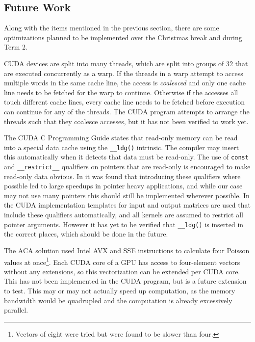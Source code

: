 \subsection{Future Work}
\label{sec:FutureOptimization}
Along with the items mentioned in the previous section, there are some optimizations planned to be implemented over the Christmas break and during Term 2.

CUDA devices are split into many threads, which are split into groups of 32 that are executed concurrently as a warp\cite{tool:CUDAProgrammingV1}.
If the threads in a warp attempt to access multiple words in the same cache line, the access is \textit{coalesced}\cite{NVIDIAHowBlog} and only one cache line needs to be fetched for the warp to continue.
Otherwise if the accesses all touch different cache lines, every cache line needs to be fetched before execution can continue for any of the threads.
The CUDA program attempts to arrange the threads such that they coalesce accesses, but it has not been verified to work yet.

The CUDA C Programming Guide\cite{NVIDIAGlobalGuide} states that read-only memory can be read into a special data cache using the \texttt{\_\_ldg()} intrinsic.
The compiler may insert this automatically when it detects that data must be read-only.
The use of \texttt{const} and \texttt{\_\_restrict\_\_} qualifiers on pointers that are read-only is encouraged to make read-only data obvious.
In \cite{10.1145/3238147.3241533} it was found that introducing these qualifiers where possible led to large speedups in pointer heavy applications, and while our case may not use many pointers this should still be implemented wherever possible.
In the CUDA implementation templates for input and output matrices are used that include these qualifiers automatically, and all kernels are assumed to restrict all pointer arguments.
However it has yet to be verified that \texttt{\_\_ldg()} is inserted in the correct places, which should be done in the future.

The ACA solution used Intel AVX and SSE instructions\cite{IntelCorporationIntroductionExtensions} to calculate four Poisson values at once\footnote{Vectors of eight were tried but were found to be slower than four.}.
Each CUDA core of a GPU has access to four-element vectors without any extensions, so this vectorization can be extended per CUDA core. 
This has not been implemented in the CUDA program, but is a future extension to test.
This may or may not actually speed up computation, as the memory bandwidth would be quadrupled and the computation is already excessively parallel.

